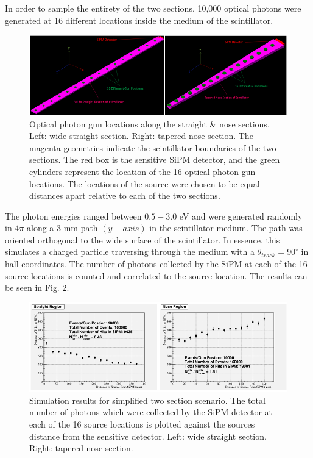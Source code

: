 In order to sample the entirety of the two sections, 10,000 optical photons were generated at 16 different locations inside the medium of the scintillator. 
	\begin{figure}[!htb]
	\centering
	\includegraphics[width=1.0\columnwidth]{simulation/figs/gun_locations}
	\caption{Optical photon gun locations along the straight \& nose sections. Left: wide straight section.  Right: tapered nose section.  The magenta geometries indicate the scintillator boundaries of the two sections.  The red box is the sensitive SiPM detector, and the green cylinders represent the location of the 16 optical photon gun locations. The locations of the source were chosen to be equal distances apart relative to each of the two sections.}
	\label{fig:gun_locations}
	\end{figure}
The photon energies ranged between $0.5 - 3.0$ eV \cite{krane_ch7} and were generated randomly in $4\pi$ along a 3 mm path $(y-axis)$ in the scintillator medium.  The path was oriented orthogonal to the wide surface of the scintillator.  In essence, this simulates a charged particle traversing through the medium with a $\theta_{track} = 90^{\circ}$ in hall coordinates.  The number of photons collected by the SiPM at each of the 16 source locations is counted and correlated to the source location.  The results can be seen in Fig. \ref{fig:sim_results}.
	\begin{figure}[!htb]
	\centering
	\includegraphics[width=1.0\columnwidth]{simulation/figs/sim_results}
	\caption{Simulation results for simplified two section scenario. The total number of photons which were collected by the SiPM detector at each of the 16 source locations is plotted against the sources distance from the sensitive detector. Left: wide straight section.  Right: tapered nose section.}
	\label{fig:sim_results}
	\end{figure}
